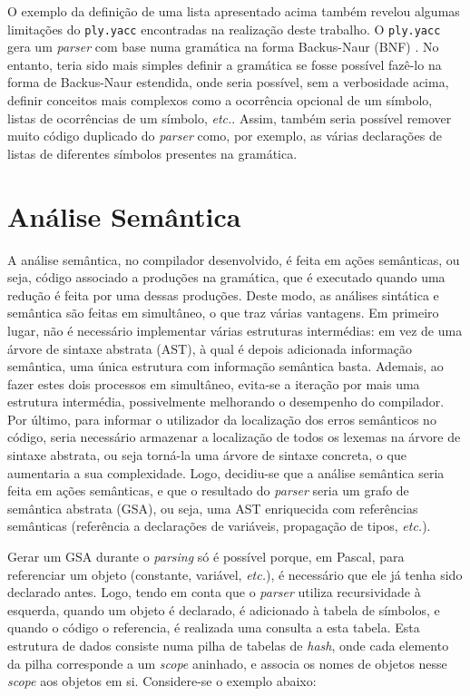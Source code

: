 \documentclass[12pt, a4paper]{article}
\begin{document}
O exemplo da definição de uma lista apresentado acima também revelou algumas limitações do
\texttt{ply.yacc} encontradas na realização deste trabalho. O \texttt{ply.yacc} gera um
\emph{parser} com base numa gramática na forma Backus-Naur (BNF) \cite{ply}. No entanto, teria sido
mais simples definir a gramática se fosse possível fazê-lo na forma de Backus-Naur estendida, onde
seria possível, sem a verbosidade acima, definir conceitos mais complexos como a ocorrência opcional
de um símbolo, listas de ocorrências de um símbolo, \emph{etc.}. Assim, também seria possível
remover muito código duplicado do \emph{parser} como, por exemplo, as várias declarações de listas
de diferentes símbolos presentes na gramática.

\section{Análise Semântica}

A análise semântica, no compilador desenvolvido, é feita em ações semânticas, ou seja, código
associado a produções na gramática, que é executado quando uma redução é feita por uma dessas
produções. Deste modo, as análises sintática e semântica são feitas em simultâneo, o que traz várias
vantagens. Em primeiro lugar, não é necessário implementar várias estruturas intermédias: em vez de
uma árvore de sintaxe abstrata (AST), à qual é depois adicionada informação semântica, uma única
estrutura com informação semântica basta. Ademais, ao fazer estes dois processos em simultâneo,
evita-se a iteração por mais uma estrutura intermédia, possivelmente melhorando o desempenho do
compilador. Por último, para informar o utilizador da localização dos erros semânticos no código,
seria necessário armazenar a localização de todos os lexemas na árvore de sintaxe abstrata, ou seja
torná-la uma árvore de sintaxe concreta, o que aumentaria a sua complexidade. Logo, decidiu-se que a
análise semântica seria feita em ações semânticas, e que o resultado do \emph{parser} seria um grafo
de semântica abstrata (GSA), ou seja, uma AST enriquecida com referências semânticas (referência a
declarações de variáveis, propagação de tipos, \emph{etc.}).

Gerar um GSA durante o \emph{parsing} só é possível porque, em Pascal, para referenciar um objeto
(constante, variável, \emph{etc.}), é necessário que ele já tenha sido declarado antes. Logo, tendo
em conta que o \emph{parser} utiliza recursividade à esquerda, quando um objeto é declarado, é
adicionado à tabela de símbolos, e quando o código o referencia, é realizada uma consulta a esta
tabela. Esta estrutura de dados consiste numa pilha de tabelas de \emph{hash}, onde cada elemento da
pilha corresponde a um \emph{scope} aninhado, e associa os nomes de objetos nesse \emph{scope} aos
objetos em si. Considere-se o exemplo abaixo:
\end{document}
